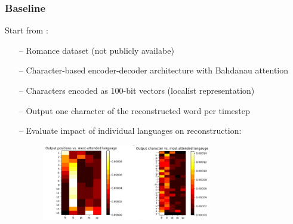 \documentclass[11pt]{beamer}
\begin{document}
\begin{frame}
    \frametitle{Baseline}
    Start from \cite{meloni_ab_2019}: 
    \begin{itemize}
        \item[--] Romance dataset (not publicly availabe)
        \item[--] Character-based encoder-decoder architecture with Bahdanau attention
        \item[--] Characters encoded as 100-bit vectors (localist representation)
        \item[--] Output one character of the reconstructed word per timestep 
        \item[--] Evaluate impact of individual languages on reconstruction:
        \newline
        \begin{figure}[t]
            \centering
            \includegraphics[width=0.7\textwidth]{graphics/meloni_figure_4.png} 
        \end{figure}
    \end{itemize}
\end{frame}
\end{document}
